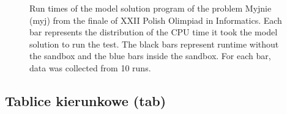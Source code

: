\documentclass[en]{pracamgr}
\begin{document}
\begin{appendices}
\begin{figure}[H]
\caption{Run times of the model solution program of the problem Myjnie (myj) from the finale of XXII Polish Olimpiad in Informatics. Each bar represents the distribution of the CPU time it took the model solution to run the test. The black bars represent runtime without the sandbox and the blue bars inside the sandbox. For each bar, data was collected from 10 runs.}
\label{figure:myj_model_solution_cpu_time}
\end{figure}

\subsection{Tablice kierunkowe (tab)}


\end{appendices}
\end{document}
